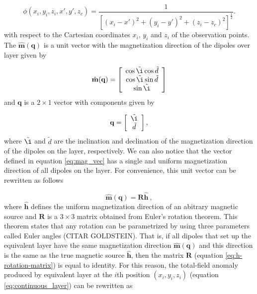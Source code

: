 \begin{equation}
\phi (x_i,y_i,z_i,x',y',z_c) = \frac{1}{[(x_i-x')^2 + (y_i-y')^2 + (z_i-z_c)^2]^{\frac{1}{2}}} .
\label{eq:phi}
\end{equation}
with respect to the Cartesian coordinates $x_i$, $y_i$ and $z_i$ of the observation points. The $\hat{\mathbf{m}}(\mathbf{q})$ is a unit vector with the magnetization direction of the dipoles over layer given by 

\begin{equation}
	\hat{\mathbf{m}}(\mathbf{q}) =
	\left[ \begin{array}{c}
		\cos \tilde{\i} \cos \tilde{d} \\
		\cos \tilde{\i} \sin \tilde{d}\\
		\sin \tilde{\i}
	\end{array} \right] 
	\label{eq:mag_vec}
\end{equation}
and $\mathbf{q}$ is a $2 \times 1$ vector with components given by 

\begin{equation}
	\mathbf{q} =
	\left[ \begin{array}{c}
		\tilde{\i} \\ 
		\tilde{d} 
	\end{array} \right] ,
	\label{eq:q_vector}
\end{equation}
where $\tilde{\i} $ and $\tilde{d} $ are the inclination and declination of the magnetization direction of the dipoles on the layer, respectively. We can also notice that the vector defined in equation \ref{eq:mag_vec} has a single and uniform magnetization direction of all dipoles on the layer. For convenience, this unit vector can be rewritten as follows

\begin{equation}
\hat{\mathbf{m}}(\mathbf{q}) = \mathbf{R}\hat{\mathbf{h}} \: ,
\label{eq:h-rotation-matrix}
\end{equation}
where $\hat{\mathbf{h}}$ defines the uniform magnetization direction of an abitrary magnetic source and $\mathbf{R}$ is a $3 \times 3$ matrix obtained from Euler's rotation theorem. This theorem states that any rotation can be parametrized by using three parameters called Euler angles (CITAR GOLDSTEIN). That is, if all dipoles that set up the equivalent layer have the same magnetization direction $\hat{\mathbf{m}}(\mathbf{q})$ and this direction is the same as the true magnetic source $\hat{\mathbf{h}}$, then the matrix $\mathbf{R}$ (equation \ref{eq:h-rotation-matrix}) is equal to identity. For this reason, the total-field anomaly produced by equivalent layer at the $i$th position $(x_i,y_i,z_i)$ (equation \ref{eq:continuous_layer}) can be rewritten as 

